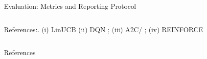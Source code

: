 \documentclass[aspectratio=169]{beamer}
\begin{document}
\begin{frame}{Evaluation: Metrics and Reporting Protocol}
\begin{columns}[T,totalwidth=\textwidth]
\begin{column}{0.3\textwidth}
{\footnotesize
References:.
(i) LinUCB \citep{li2010linucb} (ii) DQN \citep{lucarelli2020dqncrypto};
(iii) A2C/ \citep{mnih2016a3c,williams1992reinforce};
(iv) REINFORCE \citep{jiang2017cryptocurrency,jiang2017framework}
}
\end{column}
\end{columns}
\end{frame}


\begin{frame}[allowframebreaks]{References}
\footnotesize   %

\end{frame}
\end{document}

